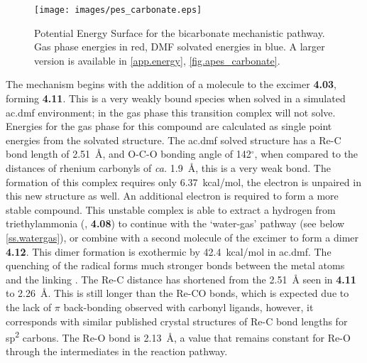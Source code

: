 \begin{figure}[!htb]
 \begin{center}
  \texttt{[image: images/pes\_carbonate.eps]}
 \end{center}
\caption[Potential Energy Surface for the bicarbonate mechanistic pathway.]{Potential Energy Surface for the bicarbonate mechanistic pathway. Gas phase energies in red, DMF solvated energies in blue. A larger version is available in \autoref{app.energy}, \autoref{fig.apes_carbonate}.}
\label{fig.pes_carbonate}
\end{figure}

The mechanism begins with the addition of a  molecule to the excimer \textbf{4.03}, forming \textbf{4.11}. This is a very weakly bound species when solved in a simulated \gls{ac.dmf} environment; in the gas phase this transition complex will not solve. Energies for the gas phase for this compound are calculated as single point energies from the solvated structure. The \gls{ac.dmf} solved structure has a Re-C bond length of 2.51~\r{A}, and O-C-O bonding angle of 142$^\circ$, when compared to the  distances of rhenium carbonyls of \textit{ca.} 1.9~\r{A}, this is a very weak bond. The formation of this complex requires only 6.37~kcal/mol, the electron is unpaired in this new structure as well. An additional electron is required to form a more stable compound. This unstable complex is able to extract a hydrogen from triethylammonia (, \textbf{4.08}) to continue with the `water-gas' pathway (see below \autoref{ss.watergas}), or combine with a second molecule of the excimer to form a dimer \textbf{4.12}. This dimer formation is exothermic by 42.4~kcal/mol in \gls{ac.dmf}. The quenching of the radical forms much stronger bonds between the metal atoms and the linking . The Re-C distance has shortened from the 2.51~\r{A} seen in \textbf{4.11} to 2.26~\r{A}. This is still longer than the Re-CO bonds, which is expected due to the lack of $\pi$ back-bonding observed with carbonyl ligands, however, it corresponds with similar published crystal structures of Re-C bond lengths for sp\textsuperscript{2} carbons\autocite{lukehart1977}. The Re-O bond is 2.13~\r{A}, a value that remains constant for Re-O through the intermediates in the reaction pathway.

